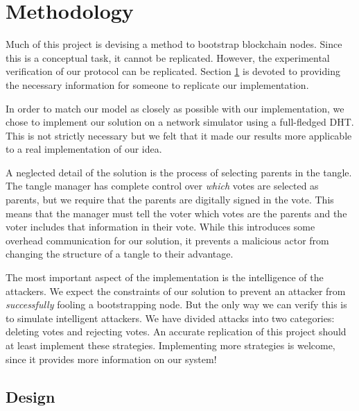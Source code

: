 \section{Methodology}
\label{sec:methodology}


Much of this project is devising a method to bootstrap blockchain nodes.
Since this is a conceptual task, it cannot be replicated.
However, the experimental verification of our protocol can be replicated.
Section \ref{sec:methodology} is devoted to providing the necessary information for someone to replicate our implementation.


In order to match our model as closely as possible with our implementation, we chose to implement our solution on a network simulator using a full-fledged DHT.
This is not strictly necessary but we felt that it made our results more applicable to a real implementation of our idea.


A neglected detail of the solution is the process of selecting parents in the tangle.
The tangle manager has complete control over \textit{which} votes are selected as parents, but we require that the parents are digitally signed in the vote.
This means that the manager must tell the voter which votes are the parents and the voter includes that information in their vote.
While this introduces some overhead communication for our solution, it prevents a malicious actor from changing the structure of a tangle to their advantage.


The most important aspect of the implementation is the intelligence of the attackers.
We expect the constraints of our solution to prevent an attacker from \textit{successfully} fooling a bootstrapping node.
But the only way we can verify this is to simulate intelligent attackers.
We have divided attacks into two categories: deleting votes and rejecting votes.
An accurate replication of this project should at least implement these strategies.
Implementing more strategies is welcome, since it provides more information on our system!

\subsection{Design}

